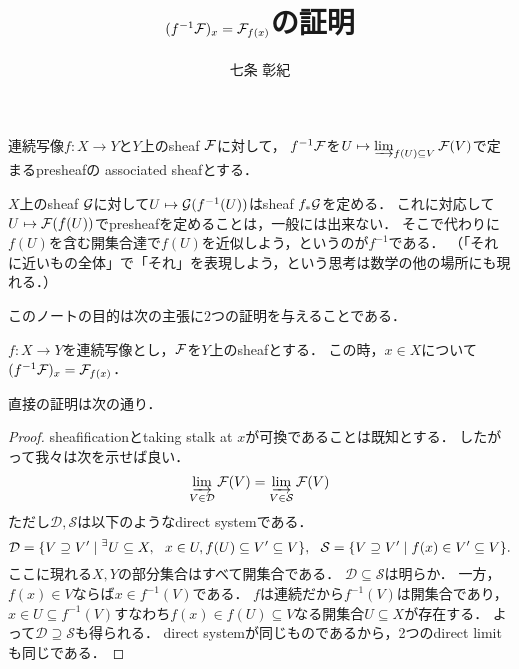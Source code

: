 \documentclass[a4paper]{jsarticle}
\title{$(f^{-1}\mathcal{F})_x=\mathcal{F}_{f(x)}$の証明}
\author{七条 彰紀}
\begin{document}
\maketitle

\begin{Def}
    連続写像$f: X \to Y$と$Y$上のsheaf $\mathcal{F}$に対して，
    $f^{-1} \mathcal{F}$を$U \mapsto \varinjlim_{f(U) \subseteq V} \mathcal{F}(V)$で定まるpresheafの
    associated sheafとする．
\end{Def}

$X$上のsheaf $\mathcal{G}$に対して$U \mapsto \mathcal{G}(f^{-1}(U))$はsheaf $f_*\mathcal{G}$を定める．
これに対応して$U \mapsto \mathcal{F}(f(U))$でpresheafを定めることは，一般には出来ない．
そこで代わりに$f(U)$を含む開集合達で$f(U)$を近似しよう，というのが$f^{-1}$である．
（「それに近いもの全体」で「それ」を表現しよう，という思考は数学の他の場所にも現れる．）

このノートの目的は次の主張に$2$つの証明を与えることである．
\begin{Prop}[$*$]
    $f: X \to Y$を連続写像とし，$\mathcal{F}$を$Y$上のsheafとする．
    この時，$x \in X$について$(f^{-1}\mathcal{F})_x=\mathcal{F}_{f(x)}$．
\end{Prop}

直接の証明は次の通り．
\begin{proof}
    sheafificationとtaking stalk at $x$が可換であることは既知とする．
    したがって我々は次を示せば良い．
    \[ \varinjlim_{V \in \mathcal{D}} \mathcal{F}(V)=\varinjlim_{V \in \mathcal{S}} \mathcal{F}(V) \]
    ただし$\mathcal{D}, \mathcal{S}$は以下のようなdirect systemである．
    \[
        \mathcal{D}=\{ V \supseteq V' \mid {}^{\exists} U \subseteq X,~~ x \in U, f(U) \subseteq V' \subseteq V \},~~
        \mathcal{S}=\{ V \supseteq V' \mid f(x) \in V' \subseteq V \}.
    \]
    ここに現れる$X,Y$の部分集合はすべて開集合である．
    $\mathcal{D} \subseteq \mathcal{S}$は明らか．
    一方，$f(x) \in V$ならば$x \in f^{-1}(V)$である．
    $f$は連続だから$f^{-1}(V)$は開集合であり，
    $x \in U \subseteq f^{-1}(V)$すなわち$f(x) \in f(U) \subseteq V$なる開集合$U \subseteq X$が存在する．
    よって$\mathcal{D} \supseteq \mathcal{S}$も得られる．
    direct systemが同じものであるから，2つのdirect limitも同じである．
\end{proof}
\end{document}
